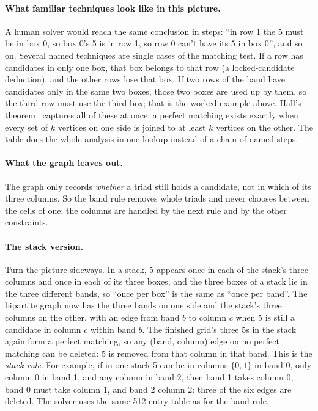 \paragraph{What familiar techniques look like in this picture.} A human solver would reach the same conclusion in
steps: ``in row 1 the 5 must be in box 0, so box 0's 5 is in row 1, so row 0 can't have its 5 in box 0'', and so on.
Several named techniques are single cases of the matching test. If a row has candidates in only one box, that box
belongs to that row (a locked-candidate deduction), and the other rows lose that box. If two rows of the band have
candidates only in the same two boxes, those two boxes are used up by them, so the third row must use the third box;
that is the worked example above.
Hall's theorem~\cite{hall1935representatives} captures all of these at once: a perfect matching exists exactly when
every set of $k$ vertices on one side is joined to at least $k$ vertices on the other. The table does the whole
analysis in one lookup instead of a chain of named steps.

\paragraph{What the graph leaves out.} The graph only records \emph{whether} a triad still holds a candidate, not in
which of its three columns. So the band rule removes whole triads and never chooses between the cells of one; the
columns are handled by the next rule and by the other constraints.

\paragraph{The stack version.} Turn the picture sideways. In a stack, 5 appears once in each of the stack's three
columns and once in each of its three boxes, and the three boxes of a stack lie in the three different bands, so
``once per box'' is the same as ``once per band''. The bipartite graph now has the three bands on one side and the
stack's three columns on the other, with an edge from band $b$ to column $c$ when 5 is still a candidate in column $c$
within band $b$. The finished grid's three 5s in the stack again form a perfect matching, so any (band, column) edge on
no perfect matching can be deleted: 5 is removed from that column in that band. This is the \emph{stack rule}. For
example, if in one stack 5 can be in columns $\{0,1\}$ in band 0, only column 0 in band 1, and any column in band 2,
then band 1 takes column 0, band 0 must take column 1, and band 2 column 2: three of the six edges are deleted. The
solver uses the same 512-entry table as for the band rule.

